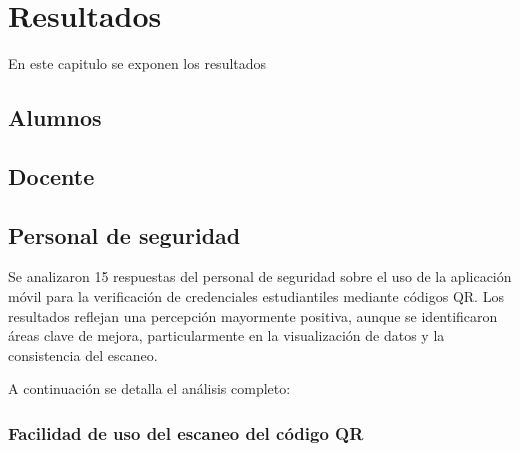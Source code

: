 \chapter{Resultados}

En este capitulo se exponen los resultados

\section{Alumnos}
\section{Docente}
\section{Personal de seguridad}

Se analizaron 15 respuestas del personal de seguridad sobre el uso de la aplicación móvil para la verificación de credenciales estudiantiles mediante códigos QR. Los resultados reflejan una percepción mayormente positiva, aunque se identificaron áreas clave de mejora, particularmente en la visualización de datos y la consistencia del escaneo.

A continuación se detalla el análisis completo:

\subsection{Facilidad de uso del escaneo del código QR}

